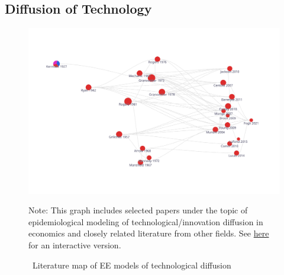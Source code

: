
\subsection{Diffusion of Technology}\label{subsec:techDiffusion}


\begin{figure}[!ht] \centering  %
	\caption{ ~Literature map of EE models of technological diffusion}
	\label{fig:graph_diffusion}
	\centerline{\includegraphics[width=\textwidth]{./figures/graph_diffusion}}
	\begin{flushleft}
		{\footnotesize Note: This graph includes selected papers under the topic of epidemiological modeling of technological/innovation diffusion in economics and closely related literature from other fields. See \href{https://app.litmaps.co/shared/1D9003CB-75FE-4633-B60A-79B70E03B691}{here} for an interactive version.}
	\end{flushleft}
\end{figure}


